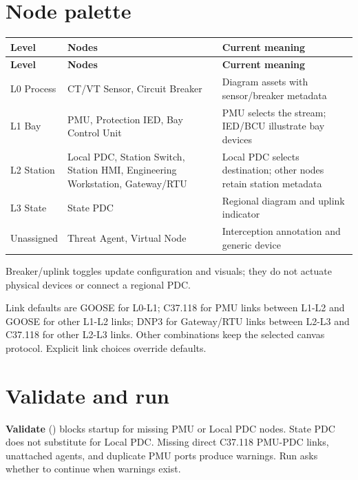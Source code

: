 \section*{Node palette}
\begingroup
\fontsize{8.7}{11.8}\selectfont
\setlength{\tabcolsep}{5pt}
\renewcommand{\arraystretch}{1.23}
\begin{longtable}{@{}>{\raggedright\arraybackslash}p{}>{\raggedright\arraybackslash}p{}>{\raggedright\arraybackslash}p{}@{}}
\rowcolor{navy} \color{white}\bfseries Level & \color{white}\bfseries Nodes & \color{white}\bfseries Current meaning \\
\endfirsthead
\rowcolor{navy} \color{white}\bfseries Level & \color{white}\bfseries Nodes & \color{white}\bfseries Current meaning \\
\endhead
\endfoot
\rowcolor{pale}
L0 Process & CT/VT Sensor, Circuit Breaker & Diagram assets with sensor/breaker metadata \\
L1 Bay & PMU, Protection IED, Bay Control Unit & PMU selects the stream; IED/BCU illustrate bay devices \\
\rowcolor{pale}
L2 Station & Local PDC, Station Switch, Station HMI, Engineering Workstation, Gateway/RTU & Local PDC selects destination; other nodes retain station metadata \\
L3 State & State PDC & Regional diagram and uplink indicator \\
\rowcolor{pale}
Unassigned & Threat Agent, Virtual Node & Interception annotation and generic device \\
\end{longtable}
\endgroup

Breaker/uplink toggles update configuration and visuals; they do not actuate physical devices or connect a regional PDC.

Link defaults are GOOSE for L0-L1; C37.118 for PMU links between L1-L2 and GOOSE for other L1-L2 links; DNP3 for Gateway/RTU links between L2-L3 and C37.118 for other L2-L3 links. Other combinations keep the selected canvas protocol. Explicit link choices override defaults.

\section*{Validate and run}
\textbf{Validate} () blocks startup for missing PMU or Local PDC nodes. State PDC does not substitute for Local PDC. Missing direct C37.118 PMU-PDC links, unattached agents, and duplicate PMU ports produce warnings. Run asks whether to continue when warnings exist.

